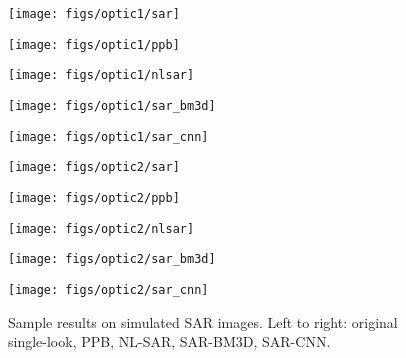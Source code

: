 \documentclass{article}
\begin{document}
\begin{figure*}[t]
	\begin{minipage}[b]{0.19\linewidth}	\centerline{\texttt{[image: figs/optic1/sar]}}	    \end{minipage}	\hfill
	\begin{minipage}[b]{0.19\linewidth}	\centerline{\texttt{[image: figs/optic1/ppb]}}	    \end{minipage}	\hfill
	\begin{minipage}[b]{0.19\linewidth}	\centerline{\texttt{[image: figs/optic1/nlsar]}}	    \end{minipage}	\hfill
	\begin{minipage}[b]{0.19\linewidth}	\centerline{\texttt{[image: figs/optic1/sar\_bm3d]}}	\end{minipage}	\hfill
	\begin{minipage}[b]{0.19\linewidth}	\centerline{\texttt{[image: figs/optic1/sar\_cnn]}}	\end{minipage}  \hfill
	
	\vspace{1mm} \noindent
	\begin{minipage}[b]{0.19\linewidth}	\centerline{\texttt{[image: figs/optic2/sar]}}	    \end{minipage}	\hfill
	\begin{minipage}[b]{0.19\linewidth}	\centerline{\texttt{[image: figs/optic2/ppb]}}	    \end{minipage}	\hfill
	\begin{minipage}[b]{0.19\linewidth}	\centerline{\texttt{[image: figs/optic2/nlsar]}}	\end{minipage}	\hfill
	\begin{minipage}[b]{0.19\linewidth}	\centerline{\texttt{[image: figs/optic2/sar\_bm3d]}}\end{minipage}	\hfill
	\begin{minipage}[b]{0.19\linewidth}	\centerline{\texttt{[image: figs/optic2/sar\_cnn]}}	\end{minipage}
	\vspace{-1em}
	\caption{Sample results on simulated SAR images. Left to right: original single-look, PPB, NL-SAR, SAR-BM3D, SAR-CNN.
    \label{fig:optical_results}}
\end{figure*}
\end{document}
